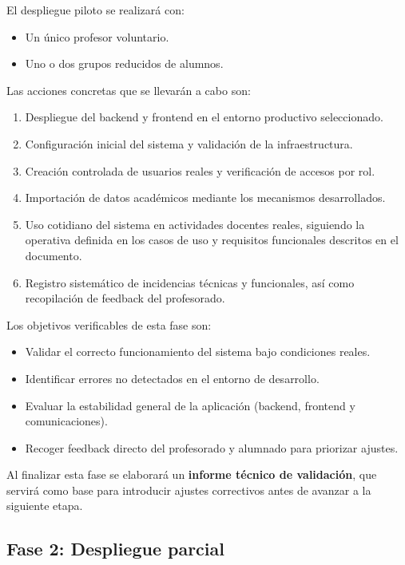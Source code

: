El despliegue piloto se realizará con:
\begin{itemize}
    \item Un único profesor voluntario.
    \item Uno o dos grupos reducidos de alumnos.
\end{itemize}

Las acciones concretas que se llevarán a cabo son:

\begin{enumerate}
    \item Despliegue del backend y frontend en el entorno productivo seleccionado.
    \item Configuración inicial del sistema y validación de la infraestructura.
    \item Creación controlada de usuarios reales y verificación de accesos por rol.
    \item Importación de datos académicos mediante los mecanismos desarrollados.
    \item Uso cotidiano del sistema en actividades docentes reales, siguiendo la operativa definida en los casos de uso y requisitos funcionales descritos en el documento.
    \item Registro sistemático de incidencias técnicas y funcionales, así como recopilación de feedback del profesorado.
\end{enumerate}

Los objetivos verificables de esta fase son:

\begin{itemize}
    \item Validar el correcto funcionamiento del sistema bajo condiciones reales.
    \item Identificar errores no detectados en el entorno de desarrollo.
    \item Evaluar la estabilidad general de la aplicación (backend, frontend y comunicaciones).
    \item Recoger feedback directo del profesorado y alumnado para priorizar ajustes.
\end{itemize}

Al finalizar esta fase se elaborará un \textbf{informe técnico de validación}, que servirá como base para introducir ajustes correctivos antes de avanzar a la siguiente etapa.

\subsection{Fase 2: Despliegue parcial}

